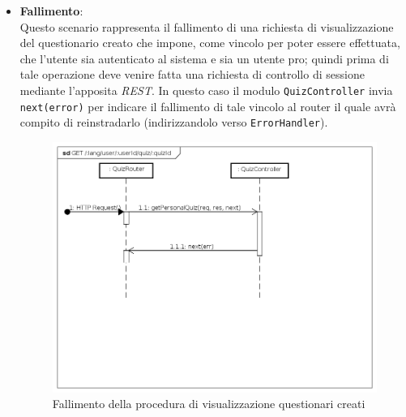 \begin{itemize}
\item \textbf{Fallimento}:\\
Questo scenario rappresenta il fallimento di una richiesta di visualizzazione del questionario creato che impone, come vincolo per poter essere effettuata, che l'utente sia autenticato al sistema e sia un utente pro; quindi prima di tale operazione deve venire fatta una richiesta di controllo di sessione mediante l'apposita \textit{REST}. In questo caso il modulo \texttt{QuizController} invia \texttt{next(error)} per indicare il fallimento di tale vincolo al router il quale avrà compito di reinstradarlo (indirizzandolo verso \texttt{ErrorHandler}).
\label{Fallimento della procedura di visualizzazione questionario creato}
\begin{figure}[ht]
	\centering
	\includegraphics[scale=0.40]{UML/DiagrammiDiSequenza/Back-end/GET__lang_user_userId_quiz_quizId_failure.png}
	\caption{Fallimento della procedura di visualizzazione questionari creati}
\end{figure}
\FloatBarrier
\end{itemize}



